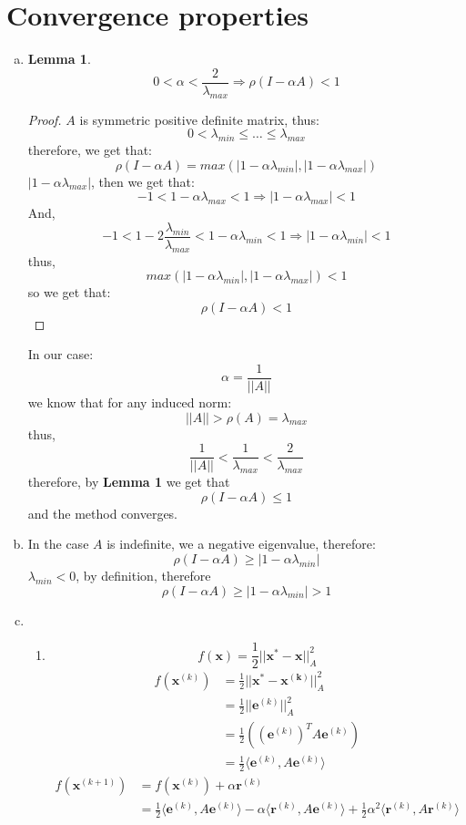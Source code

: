 \documentclass{article}
\newtheorem{lemma}{Lemma}
\begin{document}
\section{Convergence properties}
\begin{enumerate}[(a)] 
\item 
\begin{lemma} \label{a}
\[0 < \alpha < \frac{2}{\lambda_{max}} \Rightarrow \rho(I-\alpha A) < 1\]
\end{lemma}
\begin{proof}
$A$ is symmetric positive definite matrix, thus:
\[0 < \lambda_{min} \le \dots \le \lambda_{max}\]
therefore, we get that:
\[\rho(I-\alpha A) = max(|1-\alpha \lambda_{min}|, |1-\alpha \lambda_{max}|)\]
$|1-\alpha \lambda_{max}|$, then we get that:
\[-1 < 1-\alpha \lambda_{max} < 1 \Rightarrow |1-\alpha \lambda_{max}| < 1\] 
And,
\[-1 < 1-2 \frac{\lambda_{min} }{\lambda_{max} } < 1 - \alpha \lambda_{min} < 1 \Rightarrow |1-\alpha \lambda_{min}| < 1\] 
thus,
\[max(|1-\alpha \lambda_{min}|, |1-\alpha \lambda_{max}|) < 1\]
so we get that:
\[\rho(I-\alpha A) < 1\]
\end{proof}
In our case:
\[\alpha = \frac{1}{||A||}\]
we know that for any induced norm:
\[||A|| > \rho(A) = \lambda_{max}\]
thus,
\[\frac{1}{||A||} < \frac{1}{\lambda_{max}} < \frac{2}{\lambda_{max}}\]
therefore, by \textbf{Lemma 1} we get that
\[\rho(I-\alpha A) \le 1 \]
and the method converges.
\item In the case $A$ is indefinite, we a negative eigenvalue, therefore:
\[\rho(I-\alpha A)\ge |1-\alpha \lambda_{min}|\]
$\lambda_{min} < 0$, by definition, therefore
\[\rho(I-\alpha A)\ge |1-\alpha \lambda_{min}| > 1\]
\item 
\begin{enumerate}[label=(\roman*)]
\item 
\[f(\textbf{x}) = \frac{1}{2}||\textbf{x}^*-\textbf{x}||^2_A\]
\begin{align*}
f(\mathbf{x}^{(k)}) &=\frac{1}{2}||\mathbf{x}^*-\mathbf{x^{(k)}}||^2_A\\
&= \frac{1}{2}||\mathbf{e}^{(k)}||^2_A\\
&= \frac{1}{2}((\mathbf{e}^{(k)})^TA\mathbf{e}^{(k)})\\
&= \frac{1}{2}\langle \mathbf{e}^{(k)}, A\mathbf{e}^{(k)}\rangle
\end{align*}
\begin{align*}
f(\mathbf{x}^{(k+1)}) &= f(\mathbf{x}^{(k)}) + \alpha \mathbf{r}^{(k)}\\
&= \frac{1}{2}\langle\mathbf{e}^{(k)}, A\mathbf{e}^{(k)}\rangle - \alpha \langle\mathbf{r}^{(k)}, A\mathbf{e}^{(k)}\rangle +\frac{1}{2}\alpha^2\langle\mathbf{r}^{(k)}, A\mathbf{r}^{(k)}\rangle\\

\end{align*}
\end{enumerate}
\end{enumerate}
\end{document}
